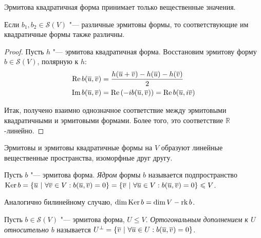 \begin{corollary}
	Эрмитова квадратичная форма принимает только вещественные значения.
\end{corollary}

\begin{proposition}
	Если $b_1, b_2 \in \mathcal{S}(V)$ "--- различные эрмитовы формы, то соответствующие им квадратичные формы также различны.
\end{proposition}

\begin{proof}
	Пусть $h$ "--- эрмитова квадратичная форма. Восстановим эрмитову форму $b \in \mathcal{S}(V)$, полярную к $h$:
	\begin{align*}
		\operatorname{Re}{b(\overline{u}, \overline{v})} &= \frac{h(\overline{u} + \overline{v}) - h(\overline{u}) - h(\overline{v})}{2}\\
		\operatorname{Im}{b(\overline{u}, \overline{v})} &= \operatorname{Re}{(-ib(\overline{u}, \overline{v}))} = \operatorname{Re}{b(\overline{u}, i\overline{v})}
	\end{align*}
	
	Итак, получено взаимно однозначное соответствие между эрмитовыми квадратичными и эрмитовыми формами. Более того, это соответствие $\mathbb{R}$-линейно.
\end{proof}

\begin{corollary}
	Эрмитовы и эрмитовы квадратичные формы на $V$ образуют линейные вещественные пространства, изоморфные друг другу.
\end{corollary}

\begin{definition}
	Пусть $b$ "--- эрмитова форма. \textit{Ядром} формы $b$ называется подпространство $\operatorname{Ker}{b} = \{\overline{u}~|~\forall \overline{v} \in V: b(\overline{u}, \overline{v}) = 0\} = \{\overline{v}~|~\forall \overline{u} \in V: b(\overline{u}, \overline{v}) = 0\} \leqslant V$.
\end{definition}

\begin{note}
	Аналогично билинейному случаю, $\dim{\operatorname{Ker}{b}} = \dim{V} - \operatorname{rk}{b}$.
\end{note}

\begin{definition}
	Пусть $b \in \mathcal{S}(V)$ "--- эрмитова форма, $U \le V$. \textit{Ортогональным дополнением к $U$ относительно $b$} называется $U^\perp \hm{=} \{\overline{v}~|~\forall \overline{u} \in U: b(\overline{u}, \overline{v}) = 0\}$.
\end{definition}


